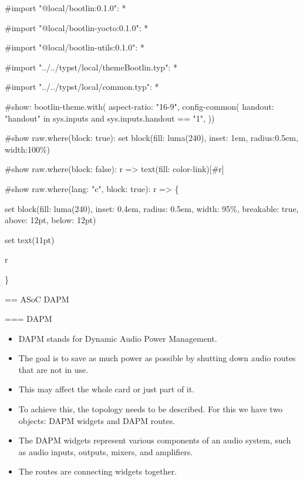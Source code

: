 #import "@local/bootlin:0.1.0": * 

#import "@local/bootlin-yocto:0.1.0": *

#import "@local/bootlin-utils:0.1.0": *

#import "../../typst/local/themeBootlin.typ": *

#import "../../typst/local/common.typ": *

#show: bootlin-theme.with(
  aspect-ratio: "16-9",
config-common(
  handout: "handout" in sys.inputs and sys.inputs.handout == "1",
))

#show raw.where(block: true): set block(fill: luma(240), inset: 1em, radius:0.5em, width:100\%) 

#show raw.where(block: false): r => { text(fill: color-link)[#r] } 

#show raw.where(lang: "c", block: true): r => \{

set block(fill: luma(240),
inset: 0.4em,
radius: 0.5em,
width: 95\%, breakable: true, above: 12pt, below: 12pt)

set text(11pt)

r

\} 

== ASoC DAPM

=== {DAPM}
  \begin{itemize}
  \item DAPM stands for Dynamic Audio Power Management.
  \item The goal is to save as much power as possible by shutting down
    audio routes that are not in use.
  \item This may affect the whole card or just part of it.
  \item To achieve this, the topology needs to be described. For this
    we have two objects: DAPM widgets and DAPM routes.
  \item The DAPM widgets represent various components of an audio
    system, such as audio inputs, outputs, mixers, and amplifiers.
  \item The routes are connecting widgets together.
  \end{itemize}



